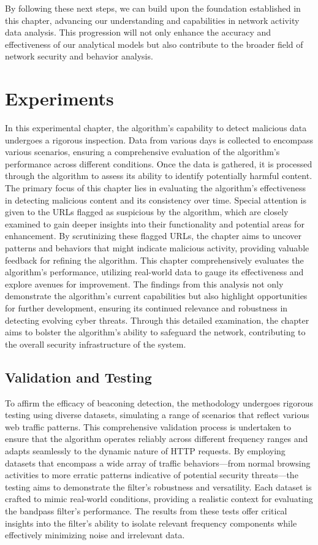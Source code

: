 By following these next steps, we can build upon the foundation established in this chapter, advancing our understanding and capabilities in network activity data analysis. This progression will not only enhance the accuracy and effectiveness of our analytical models but also contribute to the broader field of network security and behavior analysis.
\chapter{Experiments}
In this experimental chapter, the algorithm's capability to detect malicious data undergoes a rigorous inspection. Data from various days is collected to encompass various scenarios, ensuring a comprehensive evaluation of the algorithm's performance across different conditions. Once the data is gathered, it is processed through the algorithm to assess its ability to identify potentially harmful content. The primary focus of this chapter lies in evaluating the algorithm's effectiveness in detecting malicious content and its consistency over time. Special attention is given to the URLs flagged as suspicious by the algorithm, which are closely examined to gain deeper insights into their functionality and potential areas for enhancement. By scrutinizing these flagged URLs, the chapter aims to uncover patterns and behaviors that might indicate malicious activity, providing valuable feedback for refining the algorithm. This chapter comprehensively evaluates the algorithm's performance, utilizing real-world data to gauge its effectiveness and explore avenues for improvement. The findings from this analysis not only demonstrate the algorithm's current capabilities but also highlight opportunities for further development, ensuring its continued relevance and robustness in detecting evolving cyber threats. Through this detailed examination, the chapter aims to bolster the algorithm's ability to safeguard the network, contributing to the overall security infrastructure of the system.

\section{Validation and Testing}
To affirm the efficacy of beaconing detection, the methodology undergoes rigorous testing using diverse datasets, simulating a range of scenarios that reflect various web traffic patterns. This comprehensive validation process is undertaken to ensure that the algorithm operates reliably across different frequency ranges and adapts seamlessly to the dynamic nature of HTTP requests. By employing datasets that encompass a wide array of traffic behaviors—from normal browsing activities to more erratic patterns indicative of potential security threats—the testing aims to demonstrate the filter's robustness and versatility. Each dataset is crafted to mimic real-world conditions, providing a realistic context for evaluating the bandpass filter's performance. The results from these tests offer critical insights into the filter's ability to isolate relevant frequency components while effectively minimizing noise and irrelevant data.

